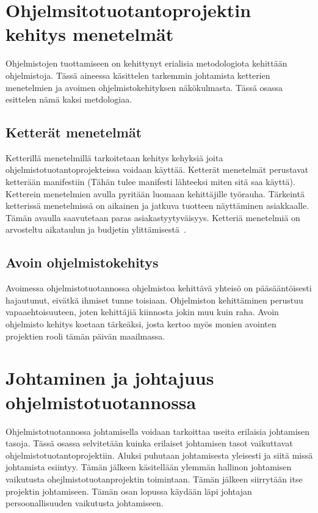 \documentclass[finnish]{tktltiki2}
\theoremstyle{definition}
\theoremstyle{remark}
\begin{document}
\section{Ohjelmsitotuotantoprojektin kehitys menetelmät}

Ohjelmistojen tuottamiseen on kehittynyt erialisia metodologiota kehittään ohjelmistoja. Tässä aineessa käsittelen tarkemmin johtamista ketterien menetelmien ja avoimen ohjelmistokehityksen näkökulmasta. Tässä osassa esittelen nämä kaksi metdologiaa.

\subsection{Ketterät menetelmät}

Ketterillä menetelmillä tarkoitetaan kehitys kehyksiä joita ohjelmistotuotantoprojekteissa voidaan käyttää. Ketterät menetelmät perustavat ketterään manifestiin (Tähän tulee manifesti lähteeksi miten sitä saa käyttä). Ketterein menetelmien avulla pyritään luomaan kehittäjille työrauha. Tärkeintä ketterissä menetelmissä on aikainen ja jatkuva tuotteen näyttäminen asiakkaalle. Tämän avaulla saavutetaan paras asiakastyytyväisyys. Ketteriä menetelmiä on arvosteltu aikataulun ja budjetin ylittämisestä~\cite{Guo:2008:SSP:1414004.1414046}.


\subsection{Avoin ohjelmistokehitys}

Avoimessa ohjelmistotuotannossa ohjelmistoa kehittävä yhteisö on pääsääntöisesti hajautunut, eivätkä ihmiset tunne toisiaan. Ohjelmiston kehittäminen perustuu vapaaehtoisuuteen, joten kehittäjiä kiinnosta jokin muu kuin raha. Avoin ohjelmisto kehitys koetaan tärkeäksi, josta kertoo myös monien avointen projektien rooli tämän päivän maailmassa. ~\cite{Li:2006:MOS:1125170.1125182}

\section{Johtaminen ja johtajuus ohjelmistotuotannossa}

Ohjelmistotuotannossa johtamisella voidaan tarkoittaa useita erilaisia johtamisen tasoja. Tässä osassa selvitetään kuinka erilaiset johtamisen tasot vaikuttavat ohjelmistotuotantoprojektiin. Aluksi puhutaan johtamisesta yleisesti ja siitä missä johtamista esiintyy. Tämän jälkeen käsitellään ylemmän hallinon johtamisen vaikutusta ohejlmistotuotanprojektin toimintaan. Tämän jälkeen siirrytään itse projektin johtamiseen. Tämän osan lopussa käydään läpi johtajan persoonallisuuden vaikutusta johtamiseen.
\end{document}
